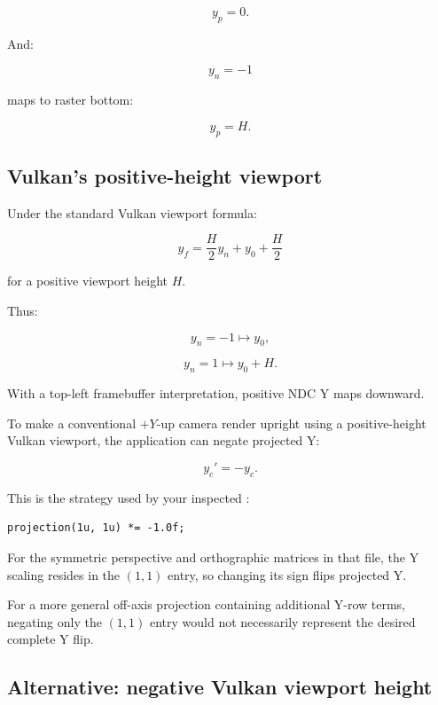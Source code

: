 \[
 y_p=0.
\]

And:

\[
 y_n=-1
\]

maps to raster bottom:

\[
 y_p=H.
\]

\subsection{Vulkan's positive-height viewport}\label{02-foundations-ii-ch033-vulkans-positive-height-viewport}

\hypertarget{02-foundations-ii-ch033-vulkans-positive-height-viewport}{}

Under the standard Vulkan viewport formula:

\[
 y_f=\frac{H}{2}y_n+y_0+\frac H2
\]

for a positive viewport height \(H\).

Thus:

\[
 y_n=-1\mapsto y_0,
\]

\[
 y_n=1\mapsto y_0+H.
\]

With a top-left framebuffer interpretation, positive NDC Y maps downward.

To make a conventional \(+Y\)-up camera render upright using a positive-height Vulkan viewport, the application can negate projected Y:

\[
 \boxed{ y_c'=-y_c }.
\]

This is the strategy used by your inspected :

\begin{verbatim}
projection(1u, 1u) *= -1.0f;
\end{verbatim}

For the symmetric perspective and orthographic matrices in that file, the Y scaling resides in the \((1,1)\) entry, so changing its sign flips projected Y.

For a more general off-axis projection containing additional Y-row terms, negating only the \((1,1)\) entry would not necessarily represent the desired complete Y flip.

\subsection{Alternative: negative Vulkan viewport height}\label{02-foundations-ii-ch033-alternative-negative-vulkan-viewport-height}

